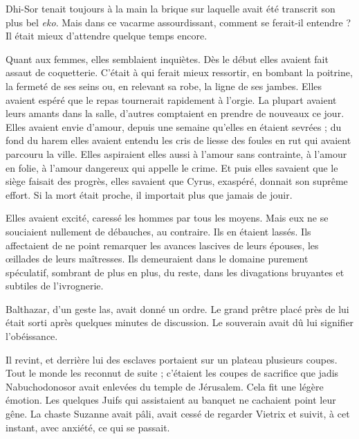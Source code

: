 \documentclass[a4paper, 11pt, oneside, polutonikogreek, french]{article}
\begin{document}
Dhi-Sor tenait toujours à la main la brique sur laquelle avait été transcrit son plus bel \emph{eko}. Mais dans ce vacarme assourdissant, comment se ferait-il entendre ? Il était mieux d'attendre quelque temps encore.

\bigskip
\centerline{\EightStarTaper}
\centerline{\EightStarTaper\EightStarTaper}
\bigskip

Quant aux femmes, elles semblaient inquiètes. Dès le début elles avaient fait assaut de coquetterie. C'était à qui ferait mieux ressortir, en bombant la poitrine, la fermeté de ses seins ou, en relevant sa robe, la ligne de ses jambes. Elles avaient espéré que le repas tournerait rapidement à l'orgie. La plupart avaient leurs amants dans la salle, d'autres comptaient en prendre de nouveaux ce jour. Elles avaient envie d'amour, depuis une semaine qu'elles en étaient sevrées ; du fond du harem elles avaient entendu les cris de liesse des foules en rut qui avaient parcouru la ville. Elles aspiraient elles aussi à l'amour sans contrainte, à l'amour en folie, à l'amour dangereux qui appelle le crime. Et puis elles savaient que le siège faisait des progrès, elles savaient que Cyrus, exaspéré, donnait son suprême effort. Si la mort était proche, il importait plus que jamais de jouir.

Elles avaient excité, caressé les hommes par tous les moyens. Mais eux ne se souciaient nullement de débauches, au contraire. Ils en étaient lassés. Ils affectaient de ne point remarquer les avances lascives de leurs épouses, les œillades de leurs maîtresses. Ils demeuraient dans le domaine purement spéculatif, sombrant de plus en plus, du reste, dans les divagations bruyantes et subtiles de l'ivrognerie.

\bigskip
\centerline{\EightStarTaper}
\centerline{\EightStarTaper\EightStarTaper}
\bigskip

Balthazar, d'un geste las, avait donné un ordre. Le grand prêtre placé près de lui était sorti après quelques minutes de discussion. Le souverain avait dû lui signifier l'obéissance.

Il revint, et derrière lui des esclaves portaient sur un plateau plusieurs coupes. Tout le monde les reconnut de suite ; c'étaient les coupes de sacrifice que jadis Nabuchodonosor avait enlevées du temple de Jérusalem. Cela fit une légère émotion. Les quelques Juifs qui assistaient au banquet ne cachaient point leur gêne. La chaste Suzanne avait pâli, avait cessé de regarder Vietrix et suivit, à cet instant, avec anxiété, ce qui se passait.
\end{document}
